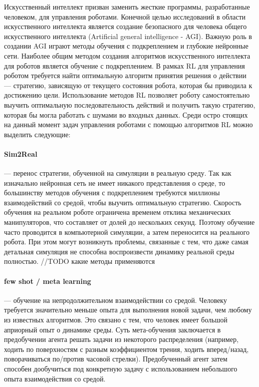 Искусственный интеллект призван заменить жесткие программы, разработанные человеком, для управления роботами. Конечной целью исследований в области искусственного интеллекта является создание безопасного для человека общего искусственного интеллекта (Artificial general intelligence - AGI). Важную роль в создании AGI играют методы обучения с подкреплением и глубокие нейронные сети. 
Наиболее общим методом создания алгоритмов искусственного интеллекта для роботов является обучение с подкреплением. В рамках RL для управления роботом требуется найти оптимальную алгоритм принятия решения о действии –-- стратегию, зависящую от текущего состояния робота, которая бы приводила к достижению цели. Использование методов RL позволяет роботу самостоятельно выучить оптимальную последовательность действий и получить такую стратегию, которая бы могла работать с шумами во входных данных. Среди остро стоящих на данный момент задач управления роботами с помощью алгоритмов RL можно выделить следующие:

\paragraph{Sim2Real} --- перенос стратегии, обученной на симуляции в реальную среду. Так как изначально нейронная сеть не имеет никакого представления о среде, то большинству методов обучения с подкреплением требуются миллионы взаимодействий со средой, чтобы выучить оптимальную стратегию. Скорость обучения на реальном роботе ограничена временем отклика механических манипуляторов, что составляет от долей до нескольких секунд. Поэтому обучение часто проводится в компьютерной симуляции, а затем переносится на реального робота. При этом могут возникнуть проблемы, связанные с тем, что даже самая детальная симуляция не способна воспроизвести динамику реальной среды полностью. 
//TODO какие методы применяются 

\paragraph{few shot / meta learning} --- обучение на непродолжительном взаимодействии со средой. Человеку требуется значительно меньше опыта для выполнения новой задачи, чем любому из известных алгоритмов. Это связано с тем, что человек имеет большой априорный опыт о динамике среды. Суть мета-обучения заключается в предобучении агента решать задачи из некоторого распределения (например, ходить по поверхностям с разным коэффициентом трения, ходить вперед/назад, поворачиваться по/против часовой стрелки). Предобученный агент затем способен дообучиться под конкретную задачу с использованием небольшого опыта взаимодействия со средой. 

